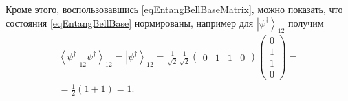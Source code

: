 Кроме этого, воспользовавшись \eqref{eqEntangBellBaseMatrix}, можно
показать, что состояния \eqref{eqEntangBellBase} нормированы, например
для $\left|\psi^{\dag}\right>_{12}$ получим 
\begin{eqnarray}
\left<\psi^{\dag}\right|_{12}\left.\psi^{\dag}\right>_{12} = 
  \left|\psi^{\dag}\right>_{12} = 
  \frac{1}{\sqrt{2}} \frac{1}{\sqrt{2}}
  \left(
  \begin{array}{cccc}
    0 & 1 & 1 & 0
  \end{array}
  \right)   
  \left(
  \begin{array}{c}
    0 \\
    1 \\
    1 \\
    0
  \end{array}
  \right) = 
\nonumber \\
=
  \frac{1}{2}\left(1 + 1\right) = 1.
\nonumber 
\end{eqnarray}
